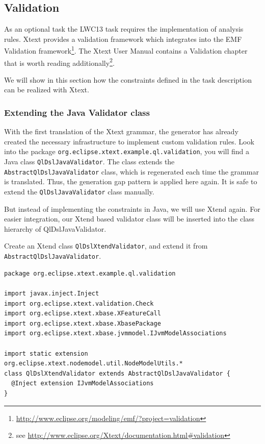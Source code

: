 \subsection{Validation} \label{sec:validation}

As an optional task the LWC13 task requires the implementation of
analysis rules. Xtext provides a validation framework which integrates into the
EMF Validation
framework\footnote{\url{http://www.eclipse.org/modeling/emf/?project=validation}}.
The Xtext User Manual contains a Validation chapter that is
worth reading additionally\footnote{see
\url{http://www.eclipse.org/Xtext/documentation.html\#validation}}.

We will show in this section how the constraints defined in the task description
can be realized with Xtext.

\subsubsection{Extending the Java Validator class}
With the first translation of the Xtext grammar, the generator has already
created the necessary infrastructure to implement custom validation rules.
Look into the package \texttt{org.eclipse.xtext.example.ql.validation}, you will
find a Java class \texttt{QlDslJavaValidator}. The class extends the
\texttt{AbstractQlDslJavaValidator} class, which is regenerated each time the
grammar is translated. Thus, the generation gap pattern is applied here again.
It is safe to extend the \texttt{QlDslJavaValidator} class manually.

But instead of implementing the constraints in Java, we will use Xtend again.
For easier integration, our Xtend based validator class will be inserted into
the class hierarchy of QlDslJavaValidator.

Create an Xtend class \texttt{QlDslXtendValidator}, and extend it from
\texttt{AbstractQlDslJavaValidator}.

\begin{lstlisting}[language=Xtend]
package org.eclipse.xtext.example.ql.validation

import javax.inject.Inject
import org.eclipse.xtext.validation.Check
import org.eclipse.xtext.xbase.XFeatureCall
import org.eclipse.xtext.xbase.XbasePackage
import org.eclipse.xtext.xbase.jvmmodel.IJvmModelAssociations

import static extension org.eclipse.xtext.nodemodel.util.NodeModelUtils.*
class QlDslXtendValidator extends AbstractQlDslJavaValidator {
  @Inject extension IJvmModelAssociations
}
\end{lstlisting}


